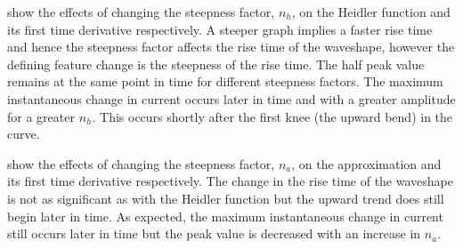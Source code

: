  show the effects of changing the steepness factor, $n_h$, on the Heidler function and its first time derivative respectively. A steeper graph implies a faster rise time and hence the steepness factor affects the rise time of the waveshape, however the defining feature change is the steepness of the rise time. The half peak value remains at the same point in time for different steepness factors. The maximum instantaneous change in current occurs later in time and with a greater amplitude for a greater $n_h$. This occurs shortly after the first knee (the upward bend) in the curve.

 show the effects of changing the steepness factor, $n_a$, on the approximation and its first time derivative respectively. The change in the rise time of the waveshape is not as significant as with the Heidler function but the upward trend does still begin later in time. As expected, the maximum instantaneous change in current still occurs later in time but the peak value is decreased with an increase in $n_a$.

